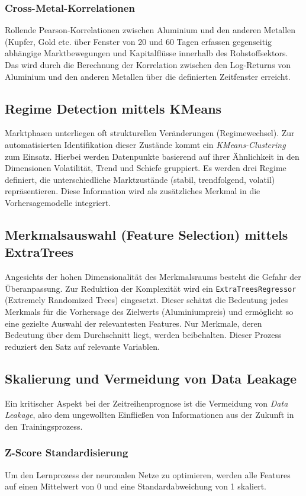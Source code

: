 \subsubsection{Cross-Metal-Korrelationen} 
Rollende Pearson-Korrelationen zwischen Aluminium und den anderen Metallen (Kupfer, Gold etc.
über Fenster von 20 und 60 Tagen erfassen gegenseitig abhängige Marktbewegungen und Kapitalflüsse innerhalb des Rohstoffsektors.
Das wird durch die Berechnung der Korrelation zwischen den Log-Returns von Aluminium und den anderen Metallen über die definierten Zeitfenster erreicht.

\subsection{Regime Detection mittels KMeans}
Marktphasen unterliegen oft strukturellen Veränderungen (Regimewechsel).
Zur automatisierten Identifikation dieser Zustände kommt ein \emph{KMeans-Clustering} zum Einsatz.
Hierbei werden Datenpunkte basierend auf ihrer Ähnlichkeit in den Dimensionen Volatilität, Trend und Schiefe gruppiert.
Es werden drei Regime definiert, die unterschiedliche Marktzustände (stabil, trendfolgend, volatil) repräsentieren.
Diese Information wird als zusätzliches Merkmal in die Vorhersagemodelle integriert.

\subsection{Merkmalsauswahl (Feature Selection) mittels ExtraTrees}
Angesichts der hohen Dimensionalität des Merkmalsraums besteht die Gefahr der Überanpassung.
Zur Reduktion der Komplexität wird ein \texttt{ExtraTreesRegressor} (Extremely Randomized Trees) eingesetzt.
Dieser schätzt die Bedeutung jedes Merkmals für die Vorhersage des Zielwerts (Aluminiumpreis) und ermöglicht so eine gezielte Auswahl der relevantesten Features.
Nur Merkmale, deren Bedeutung über dem Durchschnitt liegt, werden beibehalten.
Dieser Prozess reduziert den Satz auf relevante Variablen.

\subsection{Skalierung und Vermeidung von Data Leakage}
Ein kritischer Aspekt bei der Zeitreihenprognose ist die Vermeidung von \emph{Data Leakage}, also dem ungewollten Einfließen von Informationen aus der Zukunft in den Trainingsprozess.

\subsubsection{Z-Score Standardisierung}
Um den Lernprozess der neuronalen Netze zu optimieren, werden alle Features auf einen Mittelwert von 0 und eine Standardabweichung von 1 skaliert.

